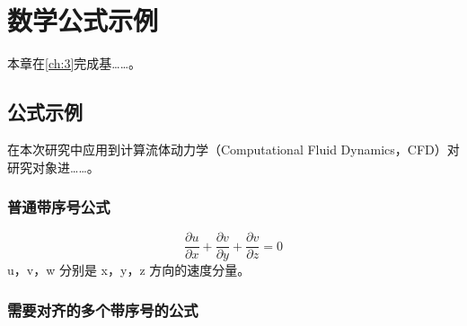 %
% 
%


\chapter{数学公式示例}\label{ch:4}

本章在\cref{ch:3}完成基……。

\section{公式示例}
在本次研究中应用到计算流体动力学（Computational Fluid Dynamics，CFD）对研究对象进……。


\subsection{普通带序号公式}
\begin{equation}
    \frac{\partial u}{\partial x}+\frac{\partial v}{\partial y}+\frac{\partial v}{\partial z}=0
\end{equation}
u，v，w 分别是 x，y，z 方向的速度分量。


\subsection{需要对齐的多个带序号的公式}


